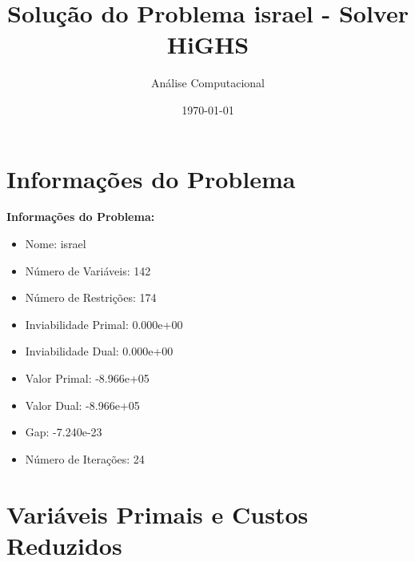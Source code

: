\documentclass[12pt]{article}
\title{Solução do Problema israel - Solver HiGHS}
\author{Análise Computacional}
\date{\today}
\begin{document}
\maketitle

\section{Informações do Problema}

\textbf{Informações do Problema:}
\begin{itemize}
\item Nome: israel
\item Número de Variáveis: 142
\item Número de Restrições: 174
\item Inviabilidade Primal: 0.000e+00
\item Inviabilidade Dual: 0.000e+00
\item Valor Primal: -8.966e+05
\item Valor Dual: -8.966e+05
\item Gap: -7.240e-23
\item Número de Iterações: 24
\end{itemize}


\section{Variáveis Primais e Custos Reduzidos}
\end{document}
